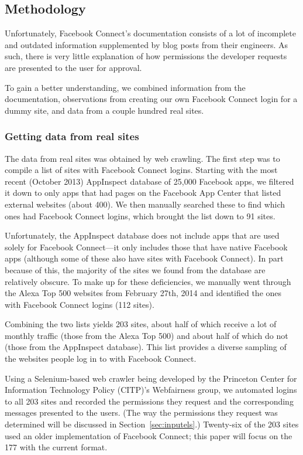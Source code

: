 \documentclass[10pt]{sig-alternate-10pt}
\begin{document}
\subsection{Methodology}

Unfortunately, Facebook Connect's documentation \cite{fbdocs} consists of a lot of incomplete and outdated information supplemented by blog posts from their engineers. As such, there is very little explanation of how permissions the developer requests are presented to the user for approval.

To gain a better understanding, we combined information from the documentation, observations from creating our own Facebook Connect login for a dummy site, and data from a couple hundred real sites.

\subsubsection{Getting data from real sites}

The data from real sites was obtained by web crawling. The first step was to compile a list of sites with Facebook Connect logins. Starting with the most recent (October 2013) AppInspect \cite{appinspect} database of 25,000 Facebook apps, we filtered it down to only apps that had pages on the Facebook App Center that listed external websites (about 400). We then manually searched these to find which ones had Facebook Connect logins, which brought the list down to 91 sites.

Unfortunately, the AppInspect database does not include apps that are used solely for Facebook Connect---it only includes those that have native Facebook apps (although some of these also have sites with Facebook Connect). In part because of this, the majority of the sites we found from the database are relatively obscure. To make up for these deficiencies, we manually went through the Alexa Top 500 \cite{alexa} websites from February 27th, 2014 and identified the ones with Facebook Connect logins (112 sites). 

Combining the two lists yields 203 sites, about half of which receive a lot of monthly traffic (those from the Alexa Top 500) and about half of which do not (those from the AppInspect database). This list provides a diverse sampling of the websites people log in to with Facebook Connect.

Using a Selenium-based web crawler being developed by the Princeton Center for Information Technology Policy (CITP)'s Webfairness group, we automated logins to all 203 sites and recorded the permissions they request and the corresponding messages presented to the users. (The way the permissions they request was determined will be discussed in Section~\ref{sec:inputels}.) Twenty-six of the 203 sites used an older implementation of Facebook Connect; this paper will focus on the 177 with the current format.
\end{document}
